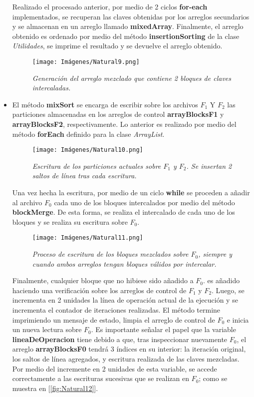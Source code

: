 \documentclass[letterpaper,12pt]{extarticle}
\begin{document}
\begin{itemize}
Realizado el procesado anterior, por medio de 2 ciclos \textbf{for-each} implementados, se recuperan las claves obtenidas por los arreglos secundarios y se almacenan en un arreglo llamado \textbf{mixedArray}. Finalmente, el arreglo obtenido es ordenado por medio del método \textbf{insertionSorting} de la clase \textit{Utilidades}, se imprime el resultado y se devuelve el arreglo obtenido.

\begin{figure}[h!]
    \centering
    \texttt{[image: Imágenes/Natural9.png]}
    \caption{\textit{Generación del arreglo mezclado que contiene 2 bloques de claves intercaladas.}}
    \label{fig:Natural9}
    \end{figure} 
    
\item El método \textbf{mixSort} se encarga de escribir sobre los archivos $F_{1}$ Y $F_{2}$ las particiones almacenadas en los arreglos de control \textbf{arrayBlocksF1} y \textbf{arrayBlocksF2}, respectivamente. Lo anterior es realizado por medio del método \textbf{forEach} definido para la clase \textit{ArrayList}.

\begin{figure}[h!]
    \centering
    \texttt{[image: Imágenes/Natural10.png]}
    \caption{\textit{Escritura de los particiones actuales sobre $F_{1}$ y $F_{2}$. Se insertan 2 saltos de línea tras cada escritura.}}
    \label{fig:Natural10}
    \end{figure} 
    
Una vez hecha la escritura, por medio de un ciclo \textbf{while} se proceden a añadir al archivo $F_{0}$ cada uno de los bloques intercalados por medio del método \textbf{blockMerge}. De esta forma, se realiza el intercalado de cada uno de los bloques y se realiza su escritura sobre $F_{0}$.

\begin{figure}[h!]
    \centering
    \texttt{[image: Imágenes/Natural11.png]}
    \caption{\textit{Proceso de escritura de los bloques mezclados sobre $F_{0}$, siempre y cuando ambos arreglos tengan bloques válidos por intercalar.}}
    \label{fig:Natural11}
    \end{figure} 
    
\pagebreak

Finalmente, cualquier bloque que no hibiese sido añadido a $F_{0}$. es añadido haciendo una verificación sobre los arreglos de control de $F_{1}$ y $F_{2}$. Luego, se incrementa en 2 unidades la línea de operación actual de la ejecución y se incrementa el contador de iteraciones realizadas. El método termine imprimiendo un mensaje de estado, limpia el arreglo de control de $F_{0}$ e inicia un nueva lectura sobre $F_{0}$. Es importante señalar el papel que la variable \textbf{lineaDeOperacion} tiene debido a que, tras inspeccionar nuevamente  $F_{0}$, el arreglo \textbf{arrayBlocksF0} tendrá 3 índices en su interior: la iteración original, los saltos de línea agregados, y escritura realizada de las claves mezcladas. Por medio del incremente en 2 unidades de esta variable, se accede correctamente a las escrituras sucesivas que se realizan en $F_{0}$; como se muestra en [\ref{fig:Natural12}].
    


\end{itemize}
\end{document}
